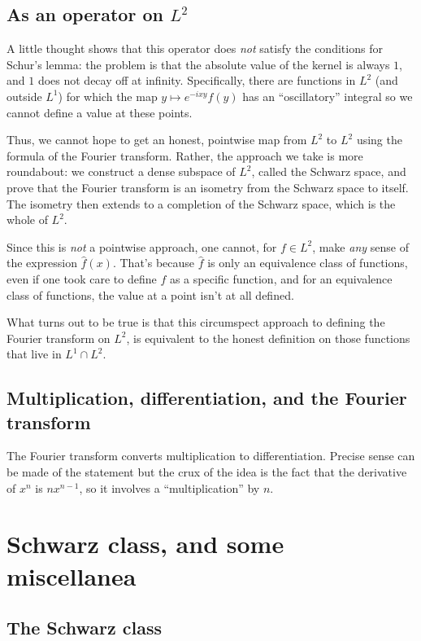 \documentclass[a4paper]{amsart}
\begin{document}
\subsection{As an operator on $L^2$}

A little thought shows that this operator does {\em not} satisfy the
conditions for Schur's lemma: the problem is that the absolute value
of the kernel is always $1$, and $1$ does not decay off at
infinity. Specifically, there are functions in $L^2$ (and outside
$L^1$) for which the map $y \mapsto e^{-ixy} f(y)$ has an
``oscillatory'' integral so we cannot define a value at these points.

Thus, we cannot hope to get an honest, pointwise map from $L^2$ to
$L^2$ using the formula of the Fourier transform. Rather, the approach
we take is more roundabout: we construct a dense subspace of $L^2$,
called the Schwarz space, and prove that the Fourier transform is an
isometry from the Schwarz space to itself. The isometry then extends
to a completion of the Schwarz space, which is the whole of $L^2$.

Since this is {\em not} a pointwise approach, one cannot, for $f \in
L^2$, make {\em any} sense of the expression $\hat{f}(x)$. That's
because $\hat{f}$ is only an equivalence class of functions, even if
one took care to define $f$ as a specific function, and for an
equivalence class of functions, the value at a point isn't at all
defined.

What turns out to be true is that this circumspect approach to
defining the Fourier transform on $L^2$, is equivalent to the honest
definition on those functions that live in $L^1 \cap L^2$.

\subsection{Multiplication, differentiation, and the Fourier transform}

The Fourier transform converts multiplication to
differentiation. Precise sense can be made of the statement %
but the crux of the idea is the fact that the derivative of $x^n$ is
$nx^{n-1}$, so it involves a ``multiplication'' by $n$.

\section{Schwarz class, and some miscellanea}

\subsection{The Schwarz class}
\end{document}

